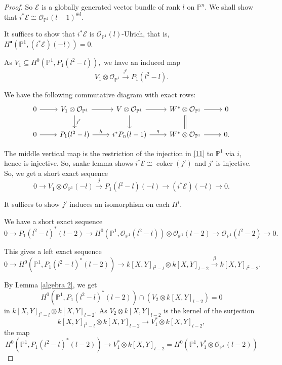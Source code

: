\documentclass[11pt,letterpaper]{amsart}
\begin{document}
\begin{proof}
So $\mathcal{E}$ is a globally generated vector bundle of rank $l$ on
$\mathbb{P}^n$. We shall show that $i^*\mathcal{E}\cong \mathcal{O}_{\mathbb{P}^1}(l-1)^{\oplus l}.$

It suffices to show that $i^*\mathcal{E}$
is $\mathcal{O}_{\mathbb{P}^1}(l)$-Ulrich, that is, $H^\bullet\!\left(\mathbb{P}^1,(i^*\mathcal{E})(-l)\right)=0.$

As $V_1
\subseteq
H^0(\mathbb{P}^1,P_1(l^2-l)),$
we have an induced map
\[
V_1\otimes\mathcal{O}_{\mathbb{P}^1}
\xrightarrow{\,j'\,}
P_1(l^2-l).
\]

We have the following commutative diagram with exact rows:
\[
\begin{tikzcd}
0 \arrow[r]
&
V_1\otimes\mathcal{O}_{\mathbb{P}^1}
\arrow[r]
\arrow[d,"j'"]
&
V\otimes\mathcal{O}_{\mathbb{P}^1}
\arrow[r,""]
\arrow[d]
&
W^*\otimes\mathcal{O}_{\mathbb{P}^1}
\arrow[r]
\arrow[d,equal]
&
0
\\
0 \arrow[r]
&
P_1(l^2-l)
\arrow[r,"h"]
&
i^*P_n(l-1)
\arrow[r,"q"]
&
W^*\otimes\mathcal{O}_{\mathbb{P}^1}
\arrow[r]
&
0.
\end{tikzcd}
\]

The middle vertical map is the restriction of the injection in \eqref{11} to
$\mathbb{P}^1$ via $i$, hence is injective. So, snake lemma shows $i^*\mathcal{E}\cong \operatorname{coker}(j')$ and $j'$ is injective. So, we get a short exact sequence
\[
0
\to
V_1\otimes\mathcal{O}_{\mathbb{P}^1}(-l)
\xrightarrow{j}
P_1(l^2-l)(-l)
\to
(i^*\mathcal{E})(-l)
\to
0.
\]

It suffices to show $j'$ induces an isomorphism on each $H^i$.

We have a short exact sequence
\[
0
\to
P_1(l^2-l)^*(l-2)
\to
H^0(\mathbb{P}^1,\mathcal{O}_{\mathbb{P}^1}(l^2-l))
\otimes
\mathcal{O}_{\mathbb{P}^1}(l-2)
\to
\mathcal{O}_{\mathbb{P}^1}(l^2-2)
\to
0.
\]

This gives a left exact sequence
\[
0
\to
H^0(\mathbb{P}^1,P_1(l^2-l)^*(l-2))
\to
k[X,Y]_{l^2-l}\otimes k[X,Y]_{l-2}
\xrightarrow{\ \beta\ }
k[X,Y]_{l^2-2}.
\]

By Lemma \ref{algebra 2}, we get
\[
H^0(\mathbb{P}^1,P_1(l^2-l)^*(l-2))
\cap
\left(
V_2\otimes k[X,Y]_{l-2}
\right)
=0
\]
in $k[X,Y]_{l^2-l}\otimes k[X,Y]_{l-2}.$ As $V_2\otimes k[X,Y]_{l-2}$
is the kernel of the surjection
\[
k[X,Y]_{l^2-l}\otimes k[X,Y]_{l-2}
\to
V_1^*\otimes k[X,Y]_{l-2},
\] the map
\[
H^0(\mathbb{P}^1,P_1(l^2-l)^*(l-2))\to V_1^*\otimes k[X,Y]_{l-2}=
H^0\!\left(
\mathbb{P}^1,
V_1^*\otimes\mathcal{O}_{\mathbb{P}^1}(l-2)
\right)
\]


\end{proof}
\end{document}
